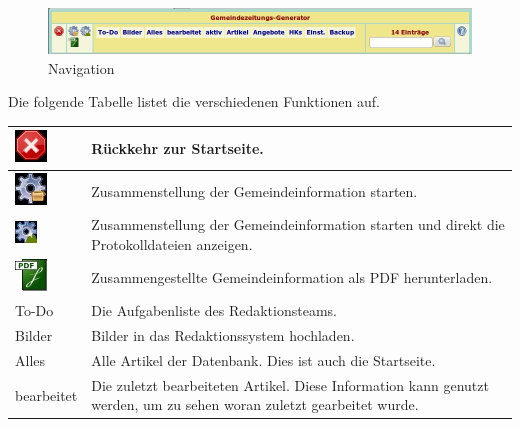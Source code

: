 \documentclass[12pt,a4paper,twoside]{article}%
\begin{document}
\begin{figure}[h]
\begin{center}
\includegraphics[width=0.9\linewidth]{webgui_kopfbereich.jpeg}
\end{center}
\caption{Navigation}
\end{figure} 

Die folgende Tabelle 
listet die verschiedenen Funktionen auf.
\begin{center}                 
\begin{tabular}{|l|p{13cm}|}
\hline
\includegraphics[height=4ex]{icons/abort.jpeg} & Rückkehr zur Startseite. \\ \hline\hline

\includegraphics[height=4ex]{icons/ark.jpeg} &  Zusammenstellung der Gemeindeinformation starten.  \\ \hline
\includegraphics[height=4ex]{icons/maker.jpeg} & Zusammenstellung der Gemeindeinformation starten und direkt die Protokolldateien anzeigen. \\ \hline
\includegraphics[height=4ex]{icons/pdfreaders.jpeg} & Zusammengestellte Gemeindeinformation als PDF herunterladen. \\ \hline\hline

 
To-Do & Die Aufgabenliste des Redaktionsteams. \\ \hline


Bilder & Bilder in das Redaktionssystem hochladen. \\ \hline
 
Alles & Alle Artikel der Datenbank. Dies ist auch die Startseite. \\ \hline

bearbeitet & Die zuletzt bearbeiteten Artikel. Diese Information kann genutzt werden, um zu sehen woran zuletzt gearbeitet wurde. \\ \hline


\end{tabular}
\end{center}
\end{document}
